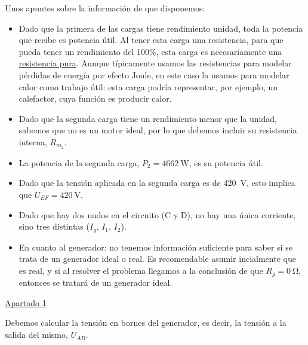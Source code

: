 \documentclass[10pt]{article}
\begin{document}
Unos apuntes sobre la información de que disponemos:
\begin{itemize}
    \item Dado que la primera de las cargas tiene rendimiento unidad, toda la potencia que recibe es potencia útil. Al tener esta carga una resistencia, para que pueda tener un rendimiento del 100\%, esta carga es necesariamente una \underline{resistencia pura}. Aunque típicamente usamos las resistencias para modelar pérdidas de energía por efecto Joule, en este caso la usamos para modelar calor como trabajo útil: esta carga podría representar, por ejemplo, un calefactor, cuya función es producir calor.
    \item Dado que la segunda carga tiene un rendimiento menor que la unidad, sabemos que no es un motor ideal, por lo que debemos incluir su resistencia interna, $R_{m_2}$.
    \item La potencia de la segunda carga, $P_2 = \qty{4662}{\watt}$, es su potencia útil.
    \item Dado que la tensión aplicada en la segunda carga es de \qty{420}{\volt}, esto implica que $U_{EF} = \qty{420}{\volt}$.
    \item Dado que hay dos nudos en el circuito (C y D), no hay una única corriente, sino tres distintas ($I_g, \, I_1, \, I_2$).
    \item En cuanto al generador: no tenemos información suficiente para saber si se trata de un generador ideal o real. Es recomendable asumir incialmente que es real, y si al resolver el problema llegamos a la conclusión de que $R_g=\qty{0}{\ohm}$, entonces se tratará de un generador ideal.
\end{itemize}


\vspace{6mm}

\underline{Apartado 1}

\vspace{4mm}

Debemos calcular la tensión en bornes del generador, es decir, la tensión a la salida del mismo, $U_{AB}$. 
\end{document}
